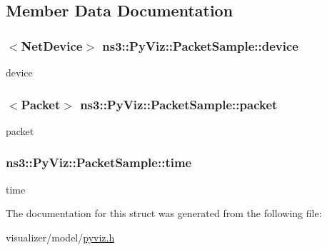 \subsection{Member Data Documentation}
\subsubsection[{\texorpdfstring{device}{device}}]{$<${\bf Net\+Device}$>$ ns3\+::\+Py\+Viz\+::\+Packet\+Sample\+::device}\hypertarget{structns3_1_1PyViz_1_1PacketSample_ad9bbbf3e89652d7c351a31dece4bb0b5}{}\label{structns3_1_1PyViz_1_1PacketSample_ad9bbbf3e89652d7c351a31dece4bb0b5}


device 

\subsubsection[{\texorpdfstring{packet}{packet}}]{$<${\bf Packet}$>$ ns3\+::\+Py\+Viz\+::\+Packet\+Sample\+::packet}\hypertarget{structns3_1_1PyViz_1_1PacketSample_ac22e75ce168860f42f8279cac4a3d676}{}\label{structns3_1_1PyViz_1_1PacketSample_ac22e75ce168860f42f8279cac4a3d676}


packet 

\subsubsection[{\texorpdfstring{time}{time}}]{ ns3\+::\+Py\+Viz\+::\+Packet\+Sample\+::time}\hypertarget{structns3_1_1PyViz_1_1PacketSample_aae168eab829eba2f06eb327f4e6906fa}{}\label{structns3_1_1PyViz_1_1PacketSample_aae168eab829eba2f06eb327f4e6906fa}


time 



The documentation for this struct was generated from the following file\+:\begin{DoxyCompactItemize}
\item 
visualizer/model/\hyperlink{pyviz_8h}{pyviz.\+h}\end{DoxyCompactItemize}
